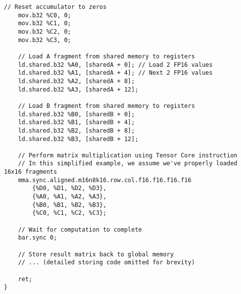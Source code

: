 \begin{lstlisting}[style=ptx]
    // Reset accumulator to zeros
    mov.b32 %C0, 0;
    mov.b32 %C1, 0;
    mov.b32 %C2, 0;
    mov.b32 %C3, 0;
    
    // Load A fragment from shared memory to registers
    ld.shared.b32 %A0, [sharedA + 0]; // Load 2 FP16 values
    ld.shared.b32 %A1, [sharedA + 4]; // Next 2 FP16 values
    ld.shared.b32 %A2, [sharedA + 8];
    ld.shared.b32 %A3, [sharedA + 12];
    
    // Load B fragment from shared memory to registers
    ld.shared.b32 %B0, [sharedB + 0];
    ld.shared.b32 %B1, [sharedB + 4];
    ld.shared.b32 %B2, [sharedB + 8];
    ld.shared.b32 %B3, [sharedB + 12];
    
    // Perform matrix multiplication using Tensor Core instruction
    // In this simplified example, we assume we've properly loaded 16x16 fragments
    mma.sync.aligned.m16n8k16.row.col.f16.f16.f16.f16 
        {%D0, %D1, %D2, %D3}, 
        {%A0, %A1, %A2, %A3}, 
        {%B0, %B1, %B2, %B3}, 
        {%C0, %C1, %C2, %C3};
    
    // Wait for computation to complete
    bar.sync 0;
    
    // Store result matrix back to global memory
    // ... (detailed storing code omitted for brevity)
    
    ret;
}
\end{lstlisting}


